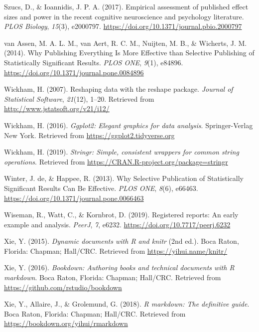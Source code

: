 \documentclass[british,,man,floatsintext]{apa6}
\begin{document}
\leavevmode\hypertarget{ref-Szucs2017}{}%
Szucs, D., \& Ioannidis, J. P. A. (2017). Empirical assessment of published effect sizes and power in the recent cognitive neuroscience and psychology literature. \emph{PLOS Biology}, \emph{15}(3), e2000797. \url{https://doi.org/10.1371/journal.pbio.2000797}

\leavevmode\hypertarget{ref-vanAssen2014}{}%
van Assen, M. A. L. M., van Aert, R. C. M., Nuijten, M. B., \& Wicherts, J. M. (2014). Why Publishing Everything Is More Effective than Selective Publishing of Statistically Significant Results. \emph{PLOS ONE}, \emph{9}(1), e84896. \url{https://doi.org/10.1371/journal.pone.0084896}

\leavevmode\hypertarget{ref-R-reshape2}{}%
Wickham, H. (2007). Reshaping data with the reshape package. \emph{Journal of Statistical Software}, \emph{21}(12), 1--20. Retrieved from \url{http://www.jstatsoft.org/v21/i12/}

\leavevmode\hypertarget{ref-R-ggplot2}{}%
Wickham, H. (2016). \emph{Ggplot2: Elegant graphics for data analysis}. Springer-Verlag New York. Retrieved from \url{https://ggplot2.tidyverse.org}

\leavevmode\hypertarget{ref-R-stringr}{}%
Wickham, H. (2019). \emph{Stringr: Simple, consistent wrappers for common string operations}. Retrieved from \url{https://CRAN.R-project.org/package=stringr}

\leavevmode\hypertarget{ref-Winter2013}{}%
Winter, J. de, \& Happee, R. (2013). Why Selective Publication of Statistically Significant Results Can Be Effective. \emph{PLOS ONE}, \emph{8}(6), e66463. \url{https://doi.org/10.1371/journal.pone.0066463}

\leavevmode\hypertarget{ref-Wiseman2019}{}%
Wiseman, R., Watt, C., \& Kornbrot, D. (2019). Registered reports: An early example and analysis. \emph{PeerJ}, \emph{7}, e6232. \url{https://doi.org/10.7717/peerj.6232}

\leavevmode\hypertarget{ref-R-knitr}{}%
Xie, Y. (2015). \emph{Dynamic documents with R and knitr} (2nd ed.). Boca Raton, Florida: Chapman; Hall/CRC. Retrieved from \url{https://yihui.name/knitr/}

\leavevmode\hypertarget{ref-R-bookdown}{}%
Xie, Y. (2016). \emph{Bookdown: Authoring books and technical documents with R markdown}. Boca Raton, Florida: Chapman; Hall/CRC. Retrieved from \url{https://github.com/rstudio/bookdown}

\leavevmode\hypertarget{ref-R-rmarkdown}{}%
Xie, Y., Allaire, J., \& Grolemund, G. (2018). \emph{R markdown: The definitive guide}. Boca Raton, Florida: Chapman; Hall/CRC. Retrieved from \url{https://bookdown.org/yihui/rmarkdown}
\end{document}
